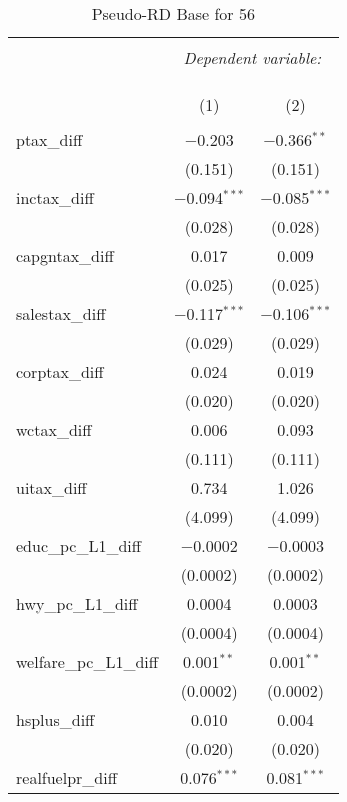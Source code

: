 
\begin{table}[!htbp] \centering 
  \caption{Pseudo-RD Base for  56} 
  \label{} 
\begin{tabular}{@{\extracolsep{5pt}}lcc} 
\\[-1.8ex]\hline 
\hline \\[-1.8ex] 
 & \multicolumn{2}{c}{\textit{Dependent variable:}} \\ 
\cline{2-3} 
\\[-1.8ex] & \multicolumn{2}{c}{ } \\ 
\\[-1.8ex] & (1) & (2)\\ 
\hline \\[-1.8ex] 
 ptax\_diff & $-$0.203 & $-$0.366$^{**}$ \\ 
  & (0.151) & (0.151) \\ 
  inctax\_diff & $-$0.094$^{***}$ & $-$0.085$^{***}$ \\ 
  & (0.028) & (0.028) \\ 
  capgntax\_diff & 0.017 & 0.009 \\ 
  & (0.025) & (0.025) \\ 
  salestax\_diff & $-$0.117$^{***}$ & $-$0.106$^{***}$ \\ 
  & (0.029) & (0.029) \\ 
  corptax\_diff & 0.024 & 0.019 \\ 
  & (0.020) & (0.020) \\ 
  wctax\_diff & 0.006 & 0.093 \\ 
  & (0.111) & (0.111) \\ 
  uitax\_diff & 0.734 & 1.026 \\ 
  & (4.099) & (4.099) \\ 
  educ\_pc\_L1\_diff & $-$0.0002 & $-$0.0003 \\ 
  & (0.0002) & (0.0002) \\ 
  hwy\_pc\_L1\_diff & 0.0004 & 0.0003 \\ 
  & (0.0004) & (0.0004) \\ 
  welfare\_pc\_L1\_diff & 0.001$^{**}$ & 0.001$^{**}$ \\ 
  & (0.0002) & (0.0002) \\ 
  hsplus\_diff & 0.010 & 0.004 \\ 
  & (0.020) & (0.020) \\ 
  realfuelpr\_diff & 0.076$^{***}$ & 0.081$^{***}$ \\ 

\end{tabular}
\end{table}
